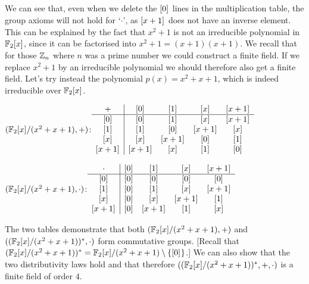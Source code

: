 We can see that, even when we delete the ${{[0]}_{}}$ lines in the multiplication
table, the group axioms will not hold for `$\cdot$', as ${{[x+1]}_{}}$ does not
have an inverse element. This can be explained by the fact that $x^2+1$ is not
an irreducible polynomial in ${ \mathbb{F}_2[x]}$, since it can be factorised into
$x^2+1=(x+1)(x+1)$. We recall that for those $\mathbb{Z}_n$ where $n$ was a prime number
we could construct a finite field. If we replace $x^2+1$ by an irreducible
polynomial we should therefore also get a finite field. Let's try instead the
polynomial $p(x)=x^2+x+1$, which is indeed irreducible over ${ \mathbb{F}_2[x]}$.

\begin{minipage}{.5\textwidth}
\begin{center}
  {$({ \mathbb{F}_2[x]}/(x^2+x+1),+)$:}\newline $\begin{array}{c|cccc} +
             &{{[0]}_{}}&{{[1]}_{}}&{{[x]}_{}}&{{[x+1]}_{}}\\\hline
    {{[0]}_{}}&{{[0]}_{}}&{{[1]}_{}}&{{[x]}_{}}&{{[x+1]}_{}}\\
    {{[1]}_{}}&{{[1]}_{}}&{{[0]}_{}}&{{[x+1]}_{}}&{{[x]}_{}}\\
    {{[x]}_{}}&{{[x]}_{}}&{{[x+1]}_{}}&{{[0]}_{}}&{{[1]}_{}}\\
    {{[x+1]}_{}}&{{[x+1]}_{}}&{{[x]}_{}}&{{[1]}_{}}&{{[0]}_{}}\\
  \end{array}$
\end{center}
\end{minipage}
\begin{minipage}{.5\textwidth}
\begin{center}
  {$({ \mathbb{F}_2[x]}/(x^2+x+1),\cdot)$:}\newline $\begin{array}{c|cccc} \cdot
    &{{[0]}_{}}&{{[1]}_{}}&{{[x]}_{}}&{{[x+1]}_{}}\\\hline
    {{[0]}_{}}&{{[0]}_{}}&{{[0]}_{}}&{{[0]}_{}}&{{[0]}_{}}\\
    {{[1]}_{}}&{{[0]}_{}}&{{[1]}_{}}&{{[x]}_{}}&{{[x+1]}_{}}\\
    {{[x]}_{}}&{{[0]}_{}}&{{[x]}_{}}&{{[x+1]}_{}}&{{[1]}_{}}\\
    {{[x+1]}_{}}&{{[0]}_{}}&{{[x+1]}_{}}&{{[1]}_{}}&{{[x]}_{}}\\
  \end{array}$
\end{center}
\end{minipage}

The two tables demonstrate that both $({ \mathbb{F}_2[x]}/(x^2+x+1),+)$ and
{$(({ \mathbb{F}_2[x]}/(x^2+x+1))^*,\cdot)$} form commutative groups. [Recall that
$({ \mathbb{F}_2[x]}/(x^2+x+1))^*={ \mathbb{F}_2[x]}/(x^2+x+1)\setminus\{{{[0]}_{}}\}$.]  We can also
show that the two distributivity laws hold and that therefore
{$(({ \mathbb{F}_2[x]}/(x^2+x+1))^*,+,\cdot)$} is a finite field of order $4$.

